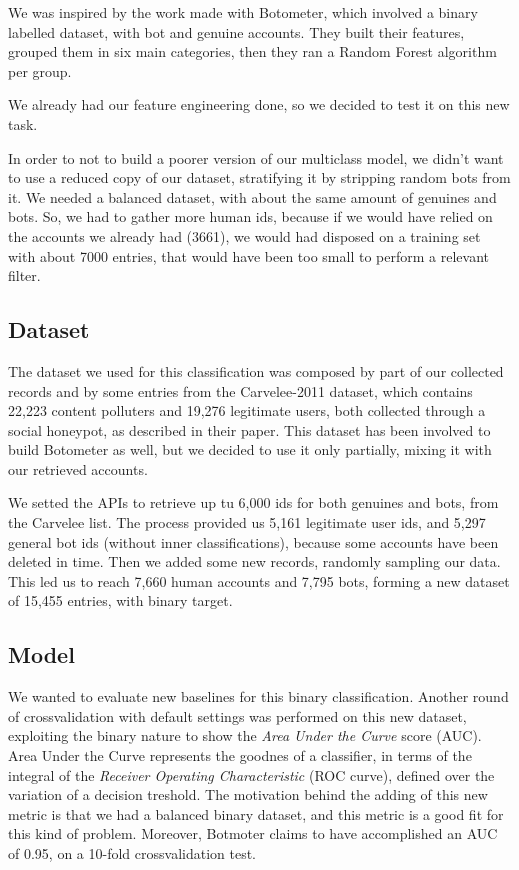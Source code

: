 We was inspired by the work made with Botometer\cite{Botometer}, which involved a binary labelled dataset, with bot and genuine accounts.
They built their features, grouped them in six main categories, then they ran a Random Forest algorithm per group.

We already had our feature engineering done, so we decided to test it on this new task.

In order to not to build a poorer version of our multiclass model, we didn't want to use a reduced copy of our dataset, stratifying it by stripping random bots from it. We needed a balanced dataset, with about the same amount of genuines and bots. So, we had to gather more human ids, because if we would have relied on the accounts we already had (3661), we would had disposed on a training set with about 7000 entries, that would have been too small to perform a relevant filter.
\subsection{Dataset}
The dataset we used for this classification was composed by part of our collected records and by some entries from the Carvelee-2011 dataset, which contains 22,223 content polluters and 19,276 legitimate users, both collected through a social honeypot, as described in their paper\cite{Lee11sevenmonths}.
This dataset has been involved to build Botometer as well, but we decided to use it only partially, mixing it with our retrieved accounts.

We setted the APIs to retrieve up tu 6,000 ids for both genuines and bots, from the Carvelee list. The process provided us 5,161 legitimate user ids, and 5,297 general bot ids (without inner classifications), because some accounts have been deleted in time.
Then we added some new records, randomly sampling our data. This led us to reach 7,660 human accounts and 7,795 bots, forming a new dataset of 15,455 entries, with binary target.
\subsection{Model}
We wanted to evaluate new baselines for this binary classification.
Another round of crossvalidation with default settings was performed on this new dataset, exploiting the binary nature to show the \textit{Area Under the Curve} score (AUC).
Area Under the Curve represents the goodnes of a classifier, in terms of the integral of the \textit{Receiver Operating Characteristic} (ROC curve), defined over the variation of a decision treshold.
The motivation behind the adding of this new metric is that we had a balanced binary dataset, and this metric is a good fit for this kind of problem. Moreover, Botmoter claims to have accomplished an AUC of 0.95, on a 10-fold crossvalidation test.

